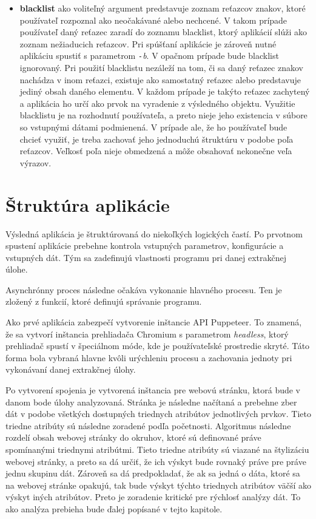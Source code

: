 \begin{itemize}
  \item \textbf{blacklist} ako voliteľný argument predstavuje zoznam reťazcov znakov, ktoré používateľ rozpoznal ako neočakávané alebo nechcené. V takom prípade používateľ daný reťazec zaradí do zoznamu blacklist, ktorý aplikácií slúži ako zoznam nežiaducich reťazcov. Pri spúšťaní aplikácie je zároveň nutné aplikáciu spustiť s parametrom \textit{\texttt{-}b}. V opačnom prípade bude blacklist ignorovaný. Pri použití blacklistu nezáleží na tom, či sa daný reťazec znakov nachádza v inom reťazci, existuje ako samostatný reťazec alebo predstavuje jediný obsah daného elementu. V každom prípade je takýto reťazec zachytený a aplikácia ho určí ako prvok na vyradenie z výsledného objektu. Využitie blacklistu je na rozhodnutí používateľa, a preto nieje jeho existencia v súbore so vstupnými dátami podmienená. V prípade ale, že ho používateľ bude chcieť využiť, je treba zachovať jeho jednoduchú štruktúru v podobe poľa reťazcov. Veľkosť poľa nieje obmedzená a môže obsahovať nekonečne veľa výrazov. 
 \end{itemize}
 
 \section{Štruktúra aplikácie}
 
 Výsledná aplikácia je štruktúrovaná do niekoľkých logických častí. Po prvotnom spustení aplikácie prebehne kontrola vstupných parametrov, konfigurácie a vstupných dát. Tým sa zadefinujú vlastnosti programu pri danej extrakčnej úlohe.
 
 Asynchrónny proces následne očakáva vykonanie hlavného procesu. Ten je zložený z funkcií, ktoré definujú správanie programu. 
 
 Ako prvé aplikácia zabezpečí vytvorenie inštancie API Puppeteer. To znamená, že sa vytvorí inštancia prehliadača Chromium s parametrom \textit{headless}, ktorý prehliadač spustí v špeciálnom móde, kde je používateľské prostredie skryté. Táto forma bola vybraná hlavne kvôli urýchleniu procesu a zachovania jednoty pri vykonávaní danej extrakčnej úlohy. 
 
 Po vytvorení spojenia je vytvorená inštancia pre webovú stránku, ktorá bude v danom bode úlohy analyzovaná. Stránka je následne načítaná a prebehne zber dát v podobe všetkých dostupných triednych atribútov jednotlivých prvkov. Tieto triedne atribúty sú následne zoradené podľa početnosti. Algoritmus následne rozdelí obsah webovej stránky do okruhov, ktoré sú definované práve spomínanými triednymi atribútmi. Tieto triedne atribúty sú viazané na štylizáciu webovej stránky, a preto sa dá určiť, že ich výskyt bude rovnaký práve pre práve jednu skupinu dát. Zároveň sa dá predpokladať, že ak sa jedná o dáta, ktoré sa na webovej stránke opakujú, tak bude výskyt týchto triednych atribútov väčší ako výskyt iných atribútov. Preto je zoradenie kritické pre rýchlosť analýzy dát. To ako analýza prebieha bude ďalej popísané v tejto kapitole.
 
